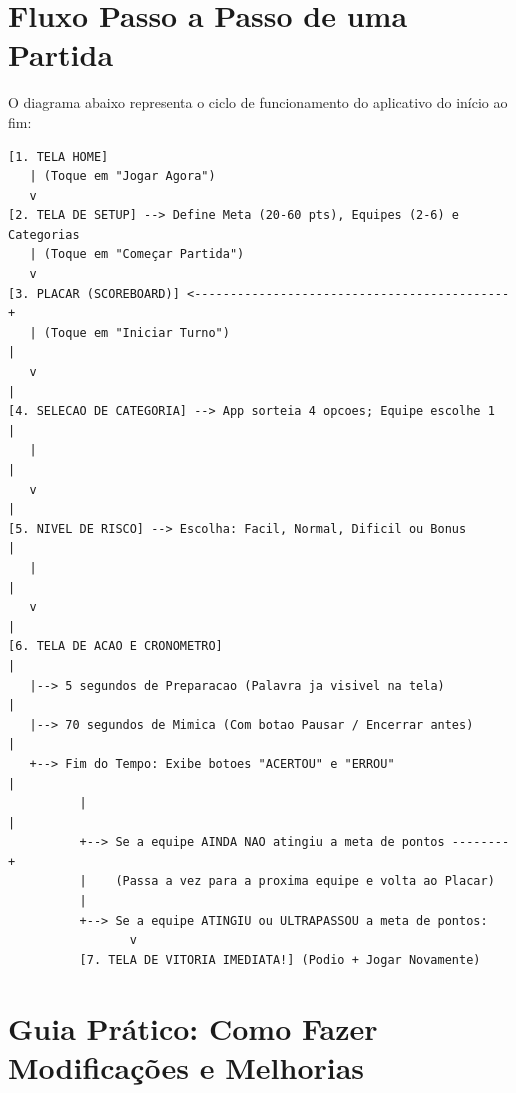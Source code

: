 \documentclass[12pt,a4paper]{article}
\begin{document}
\newpage
\section{Fluxo Passo a Passo de uma Partida}

O diagrama abaixo representa o ciclo de funcionamento do aplicativo do início ao fim:

\begin{lstlisting}
[1. TELA HOME]
   | (Toque em "Jogar Agora")
   v
[2. TELA DE SETUP] --> Define Meta (20-60 pts), Equipes (2-6) e Categorias
   | (Toque em "Começar Partida")
   v
[3. PLACAR (SCOREBOARD)] <--------------------------------------------+
   | (Toque em "Iniciar Turno")                                       |
   v                                                                  |
[4. SELECAO DE CATEGORIA] --> App sorteia 4 opcoes; Equipe escolhe 1  |
   |                                                                  |
   v                                                                  |
[5. NIVEL DE RISCO] --> Escolha: Facil, Normal, Dificil ou Bonus      |
   |                                                                  |
   v                                                                  |
[6. TELA DE ACAO E CRONOMETRO]                                        |
   |--> 5 segundos de Preparacao (Palavra ja visivel na tela)         |
   |--> 70 segundos de Mimica (Com botao Pausar / Encerrar antes)     |
   +--> Fim do Tempo: Exibe botoes "ACERTOU" e "ERROU"                |
          |                                                           |
          +--> Se a equipe AINDA NAO atingiu a meta de pontos --------+
          |    (Passa a vez para a proxima equipe e volta ao Placar)
          |
          +--> Se a equipe ATINGIU ou ULTRAPASSOU a meta de pontos:
                 v
          [7. TELA DE VITORIA IMEDIATA!] (Podio + Jogar Novamente)
\end{lstlisting}

\section{Guia Prático: Como Fazer Modificações e Melhorias}
\end{document}
